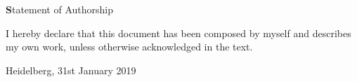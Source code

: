 \documentclass{thesisclass}
\begin{document}

\frontmatter
{}

\blankpage


\thispagestyle{plain}

\vspace*{\fill}

\centerline{\textbf Statement of Authorship}

\vspace{0.25cm}

I hereby declare that this document has been composed by myself and describes my own work, unless otherwise acknowledged in the text.

\vspace{2.5cm}

\hspace{0.25cm} Heidelberg, 31st January 2019

\vspace{2cm}

\blankpage


\thispagestyle{plain}
\end{document}
